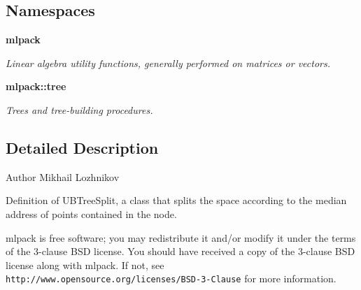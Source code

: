 \subsection*{Namespaces}
\begin{DoxyCompactItemize}
\item 
 {\bf mlpack}
\begin{DoxyCompactList}\small\item\em Linear algebra utility functions, generally performed on matrices or vectors. \end{DoxyCompactList}\item 
 {\bf mlpack\+::tree}
\begin{DoxyCompactList}\small\item\em Trees and tree-\/building procedures. \end{DoxyCompactList}\end{DoxyCompactItemize}


\subsection{Detailed Description}
\begin{DoxyAuthor}{Author}
Mikhail Lozhnikov
\end{DoxyAuthor}
Definition of U\+B\+Tree\+Split, a class that splits the space according to the median address of points contained in the node.

mlpack is free software; you may redistribute it and/or modify it under the terms of the 3-\/clause B\+SD license. You should have received a copy of the 3-\/clause B\+SD license along with mlpack. If not, see {\tt http\+://www.\+opensource.\+org/licenses/\+B\+S\+D-\/3-\/\+Clause} for more information. 